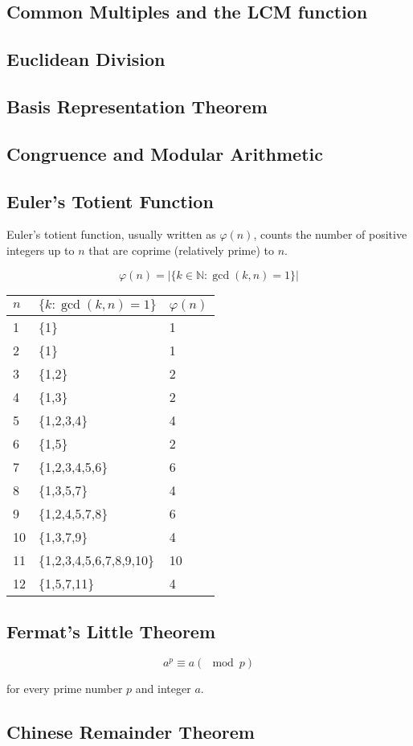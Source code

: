 \documentclass[11pt]{article}
\theoremstyle{plain}
\theoremstyle{definition}
\begin{document}
\subsection*{Common Multiples and the LCM function}

\subsection*{Euclidean Division}

\subsection*{Basis Representation Theorem}

\subsection*{Congruence and Modular Arithmetic}

\subsection*{Euler's Totient Function}

Euler's totient function, usually written as $\varphi(n)$, counts the number of positive integers up to $n$ that are coprime (relatively prime) to $n$.

$$ \varphi(n) = |\{k \in \mathbb{N} : \gcd(k, n) = 1\}| $$

\begin{center}
  \begin{tabular}{l l l}
    $n$ & $\{k : \gcd(k, n) = 1\}$ & $\varphi(n)$ \\
    \hline
    1  & \{1\}                    & 1 \\
    2  & \{1\}                    & 1 \\
    3  & \{1,2\}                  & 2 \\
    4  & \{1,3\}                  & 2 \\
    5  & \{1,2,3,4\}              & 4 \\
    6  & \{1,5\}                  & 2 \\
    7  & \{1,2,3,4,5,6\}          & 6 \\
    8  & \{1,3,5,7\}              & 4 \\
    9  & \{1,2,4,5,7,8\}          & 6 \\
    10 & \{1,3,7,9\}              & 4 \\
    11 & \{1,2,3,4,5,6,7,8,9,10\} & 10 \\
    12 & \{1,5,7,11\}             & 4 \\
  \end{tabular}
\end{center}

\subsection*{Fermat's Little Theorem}

$$
a^p \equiv a (\mod p)
$$

for every prime number $p$ and integer $a$.

\subsection*{Chinese Remainder Theorem}
\end{document}
